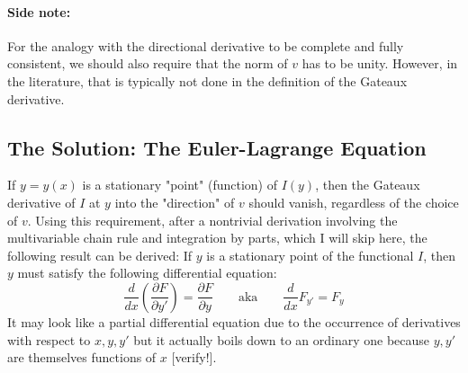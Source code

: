 \paragraph{Side note:} For the analogy with the directional derivative to be complete and fully consistent, we should also require that the norm of $v$ has to be unity. However, in the literature, that is typically not done in the definition of the Gateaux derivative. %




\subsection{The Solution: The Euler-Lagrange Equation}
If $y = y(x)$ is a stationary "point" (function) of $I(y)$, then the Gateaux derivative of $I$ at $y$ into the "direction" of $v$ should vanish, regardless of the choice of $v$. Using this requirement, after a nontrivial derivation involving the multivariable chain rule and integration by parts, which I will skip here, the following result can be derived: If $y$ is a stationary point of the functional $I$, then $y$ must satisfy the following differential equation:
\begin{equation}
 \frac{d}{d x} \left(  \frac{\partial F}{\partial y'}  \right) = \frac{\partial F}{\partial y}
 \qquad \text{aka} \qquad
 \frac{d}{d x} F_{y'} = F_{y}
\end{equation}
It may look like a partial differential equation due to the occurrence of derivatives with respect to $x,y,y'$ but it actually boils down to an ordinary one because $y,y'$ are themselves functions of $x$ [verify!].

